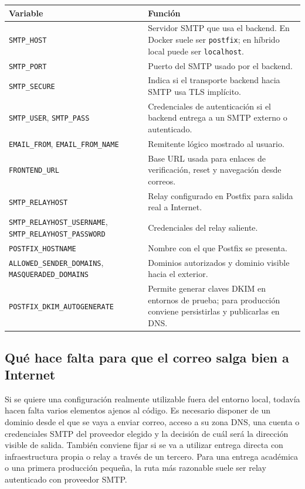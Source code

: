 \documentclass[11pt, a4paper]{article}
\begin{document}
\begin{longtable}{|p{5cm}|p{9cm}|}
\hline
\textbf{Variable} & \textbf{Función} \\
\hline
\texttt{SMTP\_HOST} & Servidor SMTP que usa el backend. En Docker suele ser \texttt{postfix}; en híbrido local puede ser \texttt{localhost}. \\
\hline
\texttt{SMTP\_PORT} & Puerto del SMTP usado por el backend. \\
\hline
\texttt{SMTP\_SECURE} & Indica si el transporte backend hacia SMTP usa TLS implícito. \\
\hline
\texttt{SMTP\_USER}, \texttt{SMTP\_PASS} & Credenciales de autenticación si el backend entrega a un SMTP externo o autenticado. \\
\hline
\texttt{EMAIL\_FROM}, \texttt{EMAIL\_FROM\_NAME} & Remitente lógico mostrado al usuario. \\
\hline
\texttt{FRONTEND\_URL} & Base URL usada para enlaces de verificación, reset y navegación desde correos. \\
\hline
\texttt{SMTP\_RELAYHOST} & Relay configurado en Postfix para salida real a Internet. \\
\hline
\texttt{SMTP\_RELAYHOST\_USERNAME}, \texttt{SMTP\_RELAYHOST\_PASSWORD} & Credenciales del relay saliente. \\
\hline
\texttt{POSTFIX\_HOSTNAME} & Nombre con el que Postfix se presenta. \\
\hline
\texttt{ALLOWED\_SENDER\_DOMAINS}, \texttt{MASQUERADED\_DOMAINS} & Dominios autorizados y dominio visible hacia el exterior. \\
\hline
\texttt{POSTFIX\_DKIM\_AUTOGENERATE} & Permite generar claves DKIM en entornos de prueba; para producción conviene persistirlas y publicarlas en DNS. \\
\hline
\end{longtable}

\subsection{Qué hace falta para que el correo salga bien a Internet}

Si se quiere una configuración realmente utilizable fuera del entorno local, todavía hacen falta varios elementos ajenos al código. Es necesario disponer de un dominio desde el que se vaya a enviar correo, acceso a su zona DNS, una cuenta o credenciales SMTP del proveedor elegido y la decisión de cuál será la dirección visible de salida. También conviene fijar si se va a utilizar entrega directa con infraestructura propia o relay a través de un tercero. Para una entrega académica o una primera producción pequeña, la ruta más razonable suele ser relay autenticado con proveedor SMTP.
\end{document}
